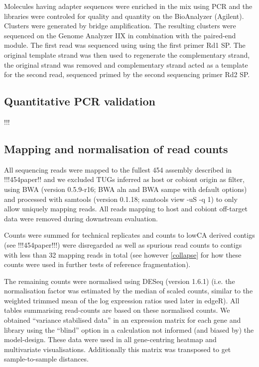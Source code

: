 \documentclass[10pt]{article}
\begin{document}
Molecules having adapter sequences were enriched in the mix using PCR
and the libraries were controled for quality and quantity on the
BioAnalyzer (Agilent). Clusters were generated by bridge
amplification. The resulting clusters were sequenced on the Genome
Analyzer IIX in combination with the paired-end module. The first read
was sequenced using using the first primer Rd1 SP. The original
template strand was then used to regenerate the complementary strand,
the original strand was removed and complementary strand acted as a
template for the second read, sequenced primed by the second
sequencing primer Rd2 SP.


\subsection{Quantitative PCR validation}

!!!

\subsection{Mapping and normalisation of read counts}

All sequencing reads were mapped to the fullest 454 assembly described
in !!!454paper!! and we excluded TUGs inferred as host or cobiont
origin as filter, using BWA \cite{pmid20080505} (version 0.5.9-r16;
BWA aln and BWA sampe with default options) and processed with
samtools \cite{journals/bioinformatics/LiHWFRHMAD09} (version 0.1.18;
samtools view -uS -q 1) to only allow uniquely mapping reads. All
reads mapping to host and cobiont off-target data were removed during
downstream evaluation.

Counts were summed for technical replicates and counts to lowCA
derived contigs (see !!!454paper!!!) were disregarded as well as
spurious read counts to contigs with less than 32 mapping reads in
total (see however \ref{collapse} for how these counts were used in
further tests of reference fragmentation).

The remaining counts were normalised using DESeq (version 1.6.1) (i.e.
the normalisation factor was estimated by the median of scaled counts,
similar to the weighted trimmed mean of the log expression ratios used
later in edgeR). All tables summarising read-counts are based on these
normalised counts. We obtained ``variance stabilised data'' in an
expression matrix for each gene and library using the ``blind'' option
in a calculation not informed (and biased by) the model-design. These
data were used in all gene-centring heatmap and multivariate
visualisations. Additionally this matrix was transposed to get
sample-to-sample distances.
\end{document}
